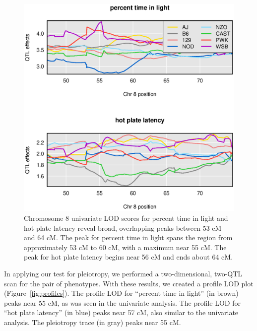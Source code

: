 \documentclass[12pt,twoside, lineno]{gsajnl}
\begin{document}
\begin{figure}
\includegraphics[width = \textwidth]{../Rmd/coefs.eps}
\caption{Chromosome 8 univariate LOD scores for percent time in light
  and hot plate latency reveal broad, overlapping peaks between 53 cM
  and 64 cM. The peak for percent time in light spans the region from
  approximately 53 cM to 60 cM, with a maximum near 55 cM. The peak
  for hot plate latency begins near 56 cM and ends about 64 cM.}
\label{fig:chr8-effects}
\end{figure}

In applying our test for pleiotropy,  we performed a two-dimensional, two-QTL scan for the pair of
phenotypes. With these results, we created a profile LOD plot
(Figure~\ref{fig:profiles}). The profile LOD for ``percent
time in light'' (in brown) peaks near 55 cM, as was seen in the univariate
analysis.  The profile LOD for ``hot plate latency'' (in blue) peaks near 57 cM,
also similar to the univariate analysis.
The pleiotropy trace (in gray) peaks near 55 cM.
\end{document}
